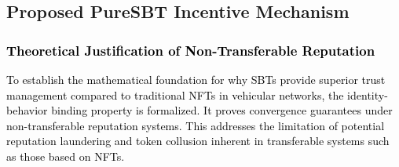 \cite{cho2010survey}\documentclass[journal,comsoc,twoside]{IEEEtran}
\begin{document}
\subsection{Proposed PureSBT Incentive Mechanism}
\textcolor{black}{
\subsubsection{Theoretical Justification of Non-Transferable Reputation}
To establish the mathematical foundation for why SBTs provide superior trust management compared to traditional NFTs in vehicular networks, the identity-behavior binding property is formalized. It proves convergence guarantees under non-transferable reputation systems. This addresses the limitation of potential reputation laundering and token collusion inherent in transferable systems such as those based on NFTs.}
\end{document}
